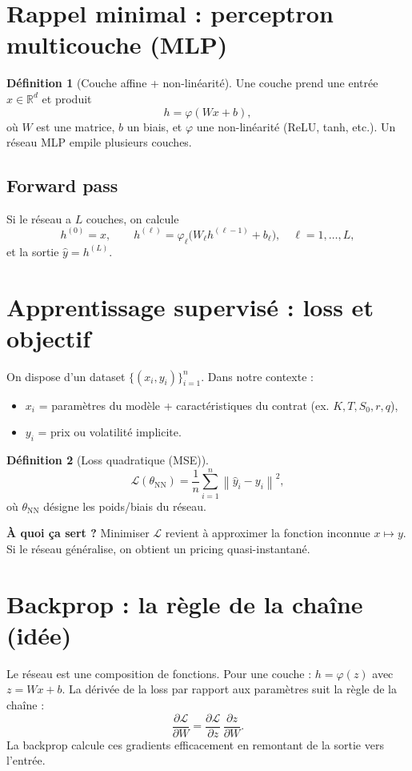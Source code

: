 \documentclass[11pt,a4paper]{report}
\newcommand{\R}{\mathbb{R}}
\newcommand{\1}{\mathbbm{1}}
\newcommand{\norm}[1]{\left\|#1\right\|}
\newcommand{\pd}[2]{\frac{\partial #1}{\partial #2}}
\theoremstyle{definition}
\newtheorem{definition}{Définition}[chapter]
\theoremstyle{plain}
\theoremstyle{remark}
\begin{document}
\section{Rappel minimal : perceptron multicouche (MLP)}
\begin{definition}[Couche affine + non-linéarité]
Une couche prend une entrée $x\in\R^d$ et produit
\[
h = \varphi(Wx+b),
\]
où $W$ est une matrice, $b$ un biais, et $\varphi$ une non-linéarité (ReLU, tanh, etc.).
Un réseau MLP empile plusieurs couches.
\end{definition}

\subsection{Forward pass}
Si le réseau a $L$ couches, on calcule
\[
h^{(0)}=x,\qquad
h^{(\ell)}=\varphi_\ell\bigl(W_\ell h^{(\ell-1)} + b_\ell\bigr),\quad \ell=1,\dots,L,
\]
et la sortie $\hat{y}=h^{(L)}$.

\section{Apprentissage supervisé : loss et objectif}
\label{sec:supervised}

On dispose d'un dataset $\{(x_i,y_i)\}_{i=1}^n$.
Dans notre contexte :
\begin{itemize}
  \item $x_i$ = paramètres du modèle + caractéristiques du contrat (ex. $K,T,S_0,r,q$),
  \item $y_i$ = prix ou volatilité implicite.
\end{itemize}

\begin{definition}[Loss quadratique (MSE)]
\[
\mathcal{L}(\theta_{\mathrm{NN}})=\frac{1}{n}\sum_{i=1}^n \norm{\hat{y}_i - y_i}^2,
\]
où $\theta_{\mathrm{NN}}$ désigne les poids/biais du réseau.
\end{definition}

\textbf{À quoi ça sert ?}
Minimiser $\mathcal{L}$ revient à approximer la fonction inconnue $x\mapsto y$.
Si le réseau généralise, on obtient un pricing quasi-instantané.

\section{Backprop : la règle de la chaîne (idée)}
Le réseau est une composition de fonctions.
Pour une couche : $h=\varphi(z)$ avec $z=Wx+b$.
La dérivée de la loss par rapport aux paramètres suit la règle de la chaîne :
\[
\pd{\mathcal{L}}{W} = \pd{\mathcal{L}}{z}\,\pd{z}{W}.
\]
La backprop calcule ces gradients efficacement en remontant de la sortie vers l'entrée.
\end{document}

